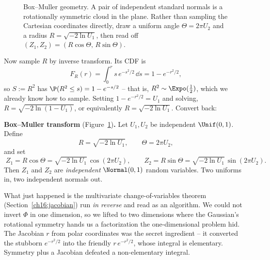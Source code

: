 \begin{figure}[H]
\centering
{}
\caption{Box--Muller geometry. A pair of independent standard normals is a rotationally
symmetric cloud in the plane. Rather than sampling the Cartesian coordinates directly, draw
a uniform angle $\Theta=2\pi U_2$ and a radius $R=\sqrt{-2\ln U_1}$, then read off
$(Z_1,Z_2)=(R\cos\Theta,\,R\sin\Theta)$.}
\label{ch16:fig-boxmuller}
\end{figure}

Now sample $R$ by inverse transform. Its CDF is
\[
  F_R(r) = \int_0^r s\,e^{-s^2/2}\,\dd s = 1 - e^{-r^2/2},
\]
so $S := R^2$ has $\P(R^2 \le s) = 1 - e^{-s/2}$ -- that is, $R^2 \sim \Expo(\tfrac12)$,
which we already know how to sample. Setting $1 - e^{-r^2/2} = U_1$ and solving,
$R = \sqrt{-2\ln(1-U_1)}$, or equivalently $R = \sqrt{-2\ln U_1}$. Convert back:

\begin{formalbox}
\textbf{Box--Muller transform} (Figure~\ref{ch16:fig-boxmuller})\textbf{.} Let $U_1, U_2$ be independent $\Unif(0,1)$. Define
\[
  R = \sqrt{-2\ln U_1}, \qquad \Theta = 2\pi U_2,
\]
and set
\[
  \boxed{\;Z_1 = R\cos\Theta = \sqrt{-2\ln U_1}\,\cos(2\pi U_2), \qquad
          Z_2 = R\sin\Theta = \sqrt{-2\ln U_1}\,\sin(2\pi U_2).\;}
\]
Then $Z_1$ and $Z_2$ are \emph{independent} $\Normal(0,1)$ random variables. Two uniforms
in, two independent normals out.
\end{formalbox}

\begin{happeningbox}
What just happened is the multivariate change-of-variables theorem
(Section~\ref{ch16:jacobian}) run \emph{in reverse} and read as an algorithm. We could not
invert $\Phi$ in one dimension, so we lifted to two dimensions where the Gaussian's
rotational symmetry hands us a factorization the one-dimensional problem hid. The Jacobian
$r$ from polar coordinates was the secret ingredient -- it converted the stubborn
$e^{-r^2/2}$ into the friendly $r\,e^{-r^2/2}$, whose integral is elementary. Symmetry plus
a Jacobian defeated a non-elementary integral.
\end{happeningbox}

